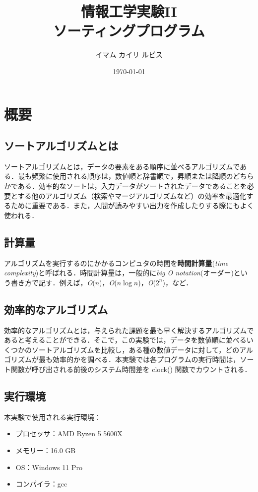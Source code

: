 \documentclass[a4j, titlepage]{jarticle}
\title{情報工学実験II\\ソーティングプログラム}
\author{イマム カイリ ルビス}
\date{\today}
\begin{document}
    \maketitle

    \tableofcontents
    \clearpage

    \section{概要}
        \subsection{ソートアルゴリズムとは}
            ソートアルゴリズムとは，データの要素をある順序に並べるアルゴリズムである．最も頻繁に使用される順序は，数値順と辞書順で，昇順または降順のどちらかである．効率的なソートは，入力データがソートされたデータであることを必要とする他のアルゴリズム（検索やマージアルゴリズムなど）の効率を最適化するために重要である．また，人間が読みやすい出力を作成したりする際にもよく使われる\cite{cite:wiki}．
            
        
        \subsection{計算量}
            アルゴリズムを実行するのにかかるコンピュタの時間を\textbf{時間計算量}(\textit{time complexity})と呼ばれる．時間計算量は，一般的に\textit{big O notation}(オーダー)という書き方で記す．例えば，\textit{O}($n$)，\textit{O}($n \log n$)，\textit{O}($2^n$)，など．

        \subsection{効率的なアルゴリズム}
            効率的なアルゴリズムとは，与えられた課題を最も早く解決するアルゴリズムであると考えることができる．そこで，この実験では，データを数値順に並べるいくつかのソートアルゴリズムを比較し，ある種の数値データに対して，どのアルゴリズムが最も効率的かを調べる．本実験では各プログラムの実行時間は，ソート関数が呼び出される前後のシステム時間差を clock() 関数でカウントされる．

        \subsection{実行環境}
            本実験で使用される実行環境：
            \begin{screen}
                \begin{itemize}
                    \item プロセッサ：AMD Ryzen 5 5600X
                    \item メモリー：16.0 GB
                    \item OS：Windows 11 Pro
                    \item コンパイラ：gcc
                \end{itemize}    
            \end{screen}
        
\end{document}
